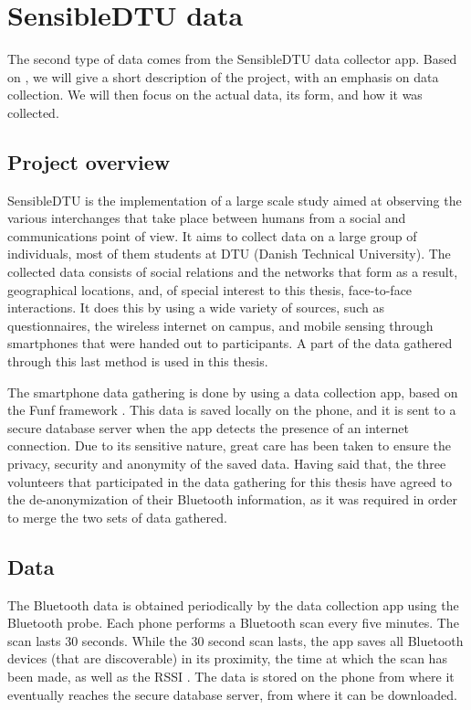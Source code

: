 \section{SensibleDTU data}

 The second type of data comes from the SensibleDTU data collector app. Based on \cite{Stopczynski,sensibledtu}, we will give a short description of the project, with an emphasis on data collection. We will then focus on the actual data, its form, and how it was collected. 

\subsection{Project overview}
 
 SensibleDTU is the implementation of a large scale study aimed at observing the various interchanges that take place between humans from a social and communications point of view. It aims to collect data on a large group of individuals, most of them students at DTU (Danish Technical University). The collected data consists of social relations and the networks that form as a result, geographical locations, and, of special interest to this thesis, face-to-face interactions. It does this by using a wide variety of sources, such as questionnaires, the wireless internet on campus, and mobile sensing through smartphones that were handed out to participants. A part of the data gathered through this last method is used in this thesis.
 
The smartphone data gathering is done by using a data collection app, based on the Funf framework \cite{funf}. This data is saved locally on the phone, and it is sent to a secure database server when the app detects the presence of an internet connection. Due to its sensitive nature, great care has been taken to ensure the privacy, security and anonymity of the saved data. Having said that, the three volunteers that participated in the data gathering for this thesis have agreed to the de-anonymization of their Bluetooth information, as it was required in order to merge the two sets of data gathered. 
 
 
\subsection{Data} 

The Bluetooth data is obtained periodically by the data collection app using the Bluetooth probe. Each phone performs a Bluetooth scan every five minutes. The scan lasts 30 seconds. While the 30 second scan lasts, the app saves all Bluetooth devices (that are discoverable) in its proximity, the time at which the scan has been made, as well as the RSSI \cite{vedran}. The data is stored on the phone from where it eventually reaches the secure database server, from where it can be downloaded. 


